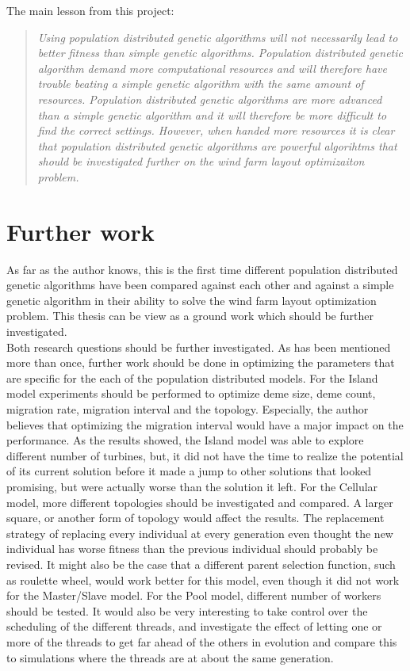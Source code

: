 \noindent The main lesson from this project:\\


\begin{quote}
\textit{Using population distributed genetic algorithms will not necessarily lead to better fitness than simple genetic algorithms. Population distributed genetic algorithm demand more computational resources and will therefore have trouble beating a simple genetic algorithm with the same amount of resources. Population distributed genetic algorithms are more advanced than a simple genetic algorithm and it will therefore be more difficult to find the correct settings. However, when handed more resources it is clear that population distributed genetic algorithms are powerful algorihtms that should be investigated further on the wind farm layout optimizaiton problem.}
\end{quote}


\section{Further work}
As far as the author knows, this is the first time different population distributed genetic algorithms have been compared against each other and against a simple genetic algorithm in their ability to solve the wind farm layout optimization problem. This thesis can be view as a ground work which should be further investigated.\\


\noindent Both research questions should be further investigated. As has been mentioned more than once, further work should be done in optimizing the parameters that are specific for the each of the population distributed models. For the Island model experiments should be performed to optimize deme size, deme count, migration rate, migration interval and the topology. Especially, the author believes that optimizing the migration interval would have a major impact on the performance. As the results showed, the Island model was able to explore different number of turbines, but, it did not have the time to realize the potential of its current solution before it made a jump to other solutions that looked promising, but were actually worse than the solution it left. For the Cellular model, more different topologies should be investigated and compared. A larger square, or another form of topology would affect the results. The replacement strategy of replacing every individual at every generation even thought the new individual has worse fitness than the previous individual should probably be revised. It might also be the case that a different parent selection function, such as roulette wheel, would work better for this model, even though it did not work for the Master/Slave model. For the Pool model, different number of workers should be tested. It would also be very interesting to take  control over the scheduling of the different threads, and investigate the effect of letting one or more of the threads to get far ahead of the others in evolution and compare this to simulations where the threads are at about the same generation. \\


